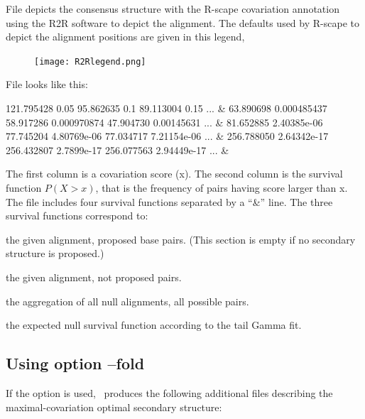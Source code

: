 File  depicts the
 consensus structure with the R-scape covariation annotation using the
 R2R software to depict the alignment.  The defaults used by R-scape
 to depict the alignment positions are given in this legend,

\begin{figure}[h]
   \begin{center}
   \texttt{[image: R2Rlegend.png]} 
  \end{center}
\end{figure}
 
 File  looks like this:

 \begin{sreoutput}
121.795428      0.05
95.862635       0.1
89.113004       0.15
...
 &
63.890698       0.000485437
58.917286       0.000970874
47.904730       0.00145631
...
 &
81.652885       2.40385e-06
77.745204       4.80769e-06
77.034717       7.21154e-06
...
 &
256.788050      2.64342e-17
256.432807      2.7899e-17
256.077563      2.94449e-17
...
 &
 \end{sreoutput}
 The first column is a covariation score (x). The second column is the
 survival function $P(X > x)$, that is the frequency of pairs having
 score larger than x. The file includes four survival functions separated by a
 ``\&'' line. The three survival functions correspond to:

 \begin{sreitems}{}
 \item[\prog{First functions:}] the given alignment, proposed base pairs.
 (This section is empty if no secondary structure is proposed.)
 \item[\prog{Second functions:}] the given alignment, not proposed pairs.
 \item[\prog{Third function:}] the aggregation of all null alignments, all possible pairs.
 \item[\prog{Fourth function:}] the expected null survival function according to the tail Gamma fit.
 \end{sreitems}

\subsection{Using option --fold}
If the option  is used, \rscape\, produces the
following additional files describing the maximal-covariation optimal
secondary structure:

